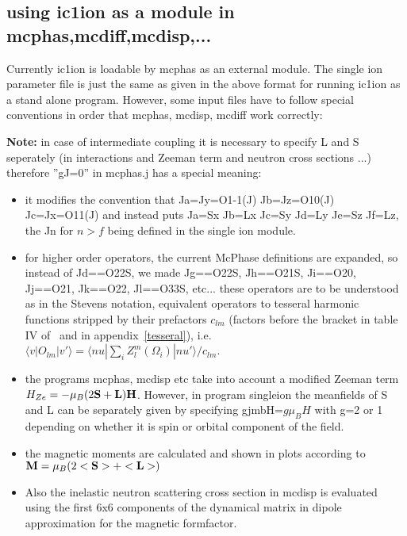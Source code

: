 \subsection{using {\prg ic1ion} as a module in {\prg mcphas},{\prg mcdiff},{\prg mcdisp},...}

Currently {\prg ic1ion} is loadable by mcphas as an external module. The single
ion parameter file is just the same as given in the above format for running {\prg ic1ion} as 
a stand alone program. However, some input files have to follow special conventions in order that 
{\prg mcphas, mcdisp, mcdiff} work correctly: 

{\bf Note:} in case of intermediate coupling
it is necessary to specify
L and S seperately (in interactions and Zeeman term and neutron cross sections ...)
therefore  ''gJ=0'' in {\prg mcphas.j} has a special meaning:
\begin{itemize}
\item  it modifies
the convention that Ja=Jy=O1-1(J) Jb=Jz=O10(J) Jc=Jx=O11(J) and instead
puts Ja=Sx Jb=Lx Jc=Sy Jd=Ly Je=Sz Jf=Lz, the Jn for $n>f$ being defined in the single
ion module. 
\item for higher order operators, the current McPhase definitions are expanded, so instead of
Jd==O22S, we made Jg==O22S, Jh==O21S, Ji==O20, Jj==O21, Jk==O22,
Jl==O33S, etc... these operators are to be understood as in the Stevens notation, equivalent
operators to tesseral harmonic functions stripped by their prefactors $c_{lm}$ (factors before the
bracket in table IV of~\cite{hutchings64-227} and in appendix~\ref{tesseral}), 
i.e. $\langle v| O_{lm}| v' \rangle=\langle nu |\sum_i Z_l^m(\Omega_i)|nu' \rangle / c_{lm}$.
\item the programs {\prg mcphas, mcdisp etc} take into account
 a modified Zeeman term $H_{Ze}=-\mu_B(2\mathbf S+\mathbf L)\mathbf H$.
 However, in program {\prg singleion} the meanfields of S and L can be
 separately given by specifying gjmbH=$g \mu_B H$ with g=2 or 1 depending
 on whether it is spin or orbital component of the field. 
\item the magnetic moments are calculated and shown in plots according 
to $\mathbf M=\mu_B(2<\mathbf S>+<\mathbf L>)$
\item Also the inelastic neutron scattering cross section in {\prg mcdisp} is evaluated using the first
6x6 components of the dynamical matrix  in dipole approximation for the magnetic formfactor.
\end{itemize}

